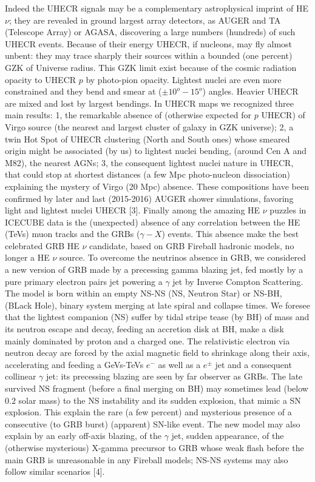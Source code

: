 \documentclass[twocolumn,twoside,10pt,nodate]{article}
\begin{document}
Indeed the UHECR  signals may be a complementary astrophysical imprint of HE $\nu$; they are revealed in ground largest array detectors, as AUGER and TA (Telescope Array) or AGASA, discovering a large numbers (hundreds) of such UHECR events. Because of their energy UHECR, if nucleons,  may fly almost unbent: they may trace sharply their sources within a bounded (one percent) GZK of Universe radius. This GZK limit exist because of the cosmic radiation opacity to UHECR $p$ by  photo-pion opacity. Lightest nuclei are even more constrained and they bend and smear at ($\pm 10^{o}-15^{o}$) angles. Heavier UHECR are mixed and lost by largest bendings. In UHECR maps we recognized three main results: 1, the remarkable absence of (otherwise expected for $p$ UHECR) of Virgo source (the nearest and largest cluster of galaxy in GZK universe); 2, a twin Hot Spot of UHECR clustering (North and South ones) whose smeared origin might be  associated (by us) to lightest nuclei bending, (around Cen A and M82), the nearest AGNs; 3, the consequent lightest nuclei nature in UHECR, that could stop at shortest distances (a few Mpc photo-nucleon dissociation) explaining the mystery of Virgo (20 Mpc) absence. These compositions have been confirmed by later and last (2015-2016) AUGER shower simulations, favoring light and lightest nuclei UHECR [3]. Finally among the amazing HE $\nu$ puzzles  in ICECUBE data is the (unexpected) absence of any correlation between the HE (TeVs) muon tracks and the GRBs ($\gamma- X$) events. This absence make the best celebrated GRB HE $\nu$ candidate, based on  GRB Fireball hadronic models, no longer a HE $\nu$  source. To overcome the neutrinos absence in GRB, we considered a new version of  GRB made by a precessing gamma blazing jet, fed mostly by a pure primary electron pairs jet powering a $\gamma$ jet by Inverse Compton Scattering. The model is born within an empty NS-NS (NS, Neutron Star) or NS-BH, (BLack Hole), binary system merging at late spiral and collapse times. We foresee that the lightest companion (NS) suffer by tidal stripe tease (by BH) of mass and its neutron escape and decay, feeding an accretion disk at BH, make a disk mainly dominated by proton and a charged one. The relativistic electron via neutron decay are forced by the axial magnetic field to shrinkage along their axis, accelerating and feeding a GeVs-TeVs  $e^{-}$ as well as a $e^{\pm}$ jet and a consequent collinear $\gamma$ jet: its precessing blazing are seen by far observer as GRBs.  The late survived NS  fragment (before a final merging on BH) may sometimes lead (below $0.2$ solar mass) to the NS instability and its sudden explosion, that mimic a SN explosion. This explain  the rare (a few percent) and mysterious  presence of a consecutive (to GRB burst)  (apparent) SN-like event. The new model may also explain by an early off-axis  blazing, of the  $\gamma$ jet, sudden  appearance, of the (otherwise mysterious) X-gamma precursor to GRB whose weak flash before the main GRB is unreasonable in any Fireball models; NS-NS systems may also follow similar scenarios [4].
\end{document}
